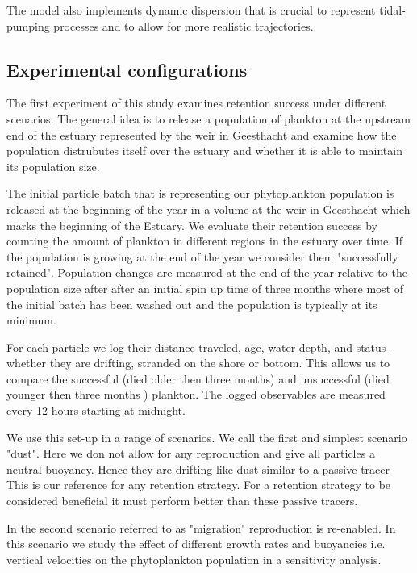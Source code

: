 The model also implements dynamic dispersion that is crucial to represent tidal-pumping processes and to allow for more realistic trajectories.

\subsection*{Experimental configurations}

The first experiment of this study examines retention success under different scenarios.
The general idea is to release a population of plankton at the upstream end of the estuary represented by the weir in Geesthacht
and examine how the population distrubutes itself over the estuary and whether it is able to maintain its population size.

The initial particle batch that is representing our phytoplankton population is released at the beginning of the year in a volume at the weir in Geesthacht which marks the beginning of the Estuary.
We evaluate their retention success by counting the amount of plankton in different regions in the estuary over time.
If the population is growing at the end of the year we consider them "successfully retained".
Population changes are measured at the end of the year relative to the population size after after an initial spin up time of three months where most of the initial batch has been washed out and the population is typically at its minimum.

For each particle we log their distance traveled, age, water depth, and status - whether they are drifting, stranded on the shore or bottom.
This allows us to compare the successful (died older then three months) and unsuccessful (died younger then three months ) plankton.
The logged observables are measured every 12 hours starting at midnight.

\medskip

We use this set-up in a range of scenarios.
We call the first and simplest scenario "dust". 
Here we don not allow for any reproduction and give all particles a neutral buoyancy.
Hence they are drifting like dust similar to a passive tracer
This is our reference for any retention strategy. 
For a retention strategy to be considered beneficial it must perform better than these passive tracers.

In the second scenario referred to as "migration" reproduction is re-enabled.
In this scenario we study the effect of different growth rates and buoyancies i.e. vertical velocities on the phytoplankton population in a sensitivity analysis.

